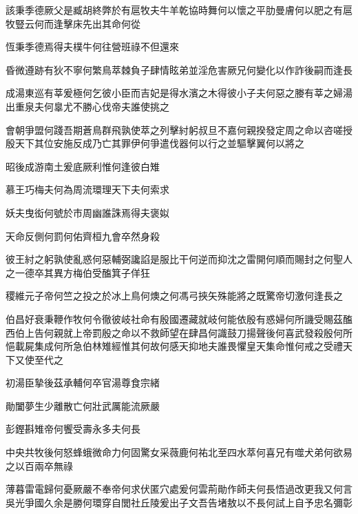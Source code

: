 \begin{pinyinscope}
該秉季德厥父是臧胡終弊於有扈牧夫牛羊乾協時舞何以懷之平肋曼膚何以肥之有扈牧豎云何而逢擊床先出其命何從

恆秉季德焉得夫樸牛何往營班祿不但還來

昏微遵跡有狄不寧何繁鳥萃棘負子肆情眩弟並淫危害厥兄何變化以作詐後嗣而逢長

成湯東巡有莘爰極何乞彼小臣而吉妃是得水濱之木得彼小子夫何惡之媵有莘之婦湯出重泉夫何辠尤不勝心伐帝夫誰使挑之

會朝爭盟何踐吾期蒼鳥群飛孰使萃之列擊紂躬叔旦不嘉何親揆發定周之命以咨嗟授殷天下其位安施反成乃亡其罪伊何爭遣伐器何以行之並驅擊翼何以將之

昭後成游南土爰底厥利惟何逢彼白雉

慕王巧梅夫何為周流環理天下夫何索求

妖夫曳衒何號於市周幽誰誅焉得夫褒姒

天命反側何罰何佑齊桓九會卒然身殺

彼王紂之躬孰使亂惑何惡輔弼讒諂是服比干何逆而抑沈之雷開何順而賜封之何聖人之一德卒其異方梅伯受醢箕子佯狂

稷維元子帝何竺之投之於冰上鳥何燠之何馮弓挾矢殊能將之既驚帝切激何逢長之

伯昌好衰秉鞭作牧何令徹彼岐社命有殷國遷藏就岐何能依殷有惑婦何所譏受賜茲醢西伯上告何親就上帝罰殷之命以不救師望在肆昌何識鼓刀揚聲後何喜武發殺殷何所悒載屍集成何所急伯林雉經惟其何故何感天抑地夫誰畏懼皇天集命惟何戒之受禮天下又使至代之

初湯臣摯後茲承輔何卒官湯尊食宗緒

勛闔夢生少離散亡何壯武厲能流厥嚴

彭鏗斟雉帝何饗受壽永多夫何長

中央共牧後何怒蜂蛾微命力何固驚女采薇鹿何祐北至四水萃何喜兄有噬犬弟何欲易之以百兩卒無祿

薄暮雷電歸何憂厥嚴不奉帝何求伏匿穴處爰何雲荊勛作師夫何長悟過改更我又何言吳光爭國久余是勝何環穿自閭社丘陵爰出子文吾告堵敖以不長何試上自予忠名彌彰


\end{pinyinscope}
